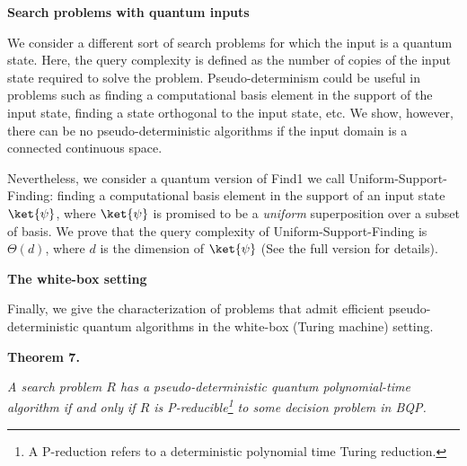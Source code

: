 \documentclass[10pt,a4paper]{article}
\begin{document}
\par\medskip\noindent\textbf{Search problems with quantum inputs}\par




We consider a different sort of search problems for which the input is a quantum state. Here, the query complexity is defined as the number of copies of the input state required to solve the problem.
Pseudo-determinism could be useful in problems such as finding a computational basis element in the support of the input state, finding a state orthogonal to the input state, etc. We show, however, there can be no pseudo-deterministic algorithms if the input domain is a connected continuous space.\par




Nevertheless, we consider a quantum version of Find1 we call Uniform-Support-Finding: finding a computational basis element in the support of an input state $\ket{\psi}$, where $\ket{\psi}$ is promised to be a \emph{uniform} superposition over a subset of basis. We prove that the query complexity of Uniform-Support-Finding is $\Theta(d)$, where $d$ is the dimension of $\ket{\psi}$ (See the full version for details).\par





\par\medskip\noindent\textbf{The white-box setting}\par




Finally, we give the characterization of problems that admit efficient pseudo-deterministic quantum algorithms in the white-box (Turing machine) setting.\par





\par\medskip\noindent\textbf{
\textbf{Theorem 7}\textbf{.}
}\par



\emph{A search problem ${R}$ has a pseudo-deterministic quantum polynomial-time algorithm if and only if ${R}$ is P-reducible\footnote{A P-reduction refers to a deterministic polynomial time Turing reduction.} to some decision problem in BQP.}\par
\end{document}
